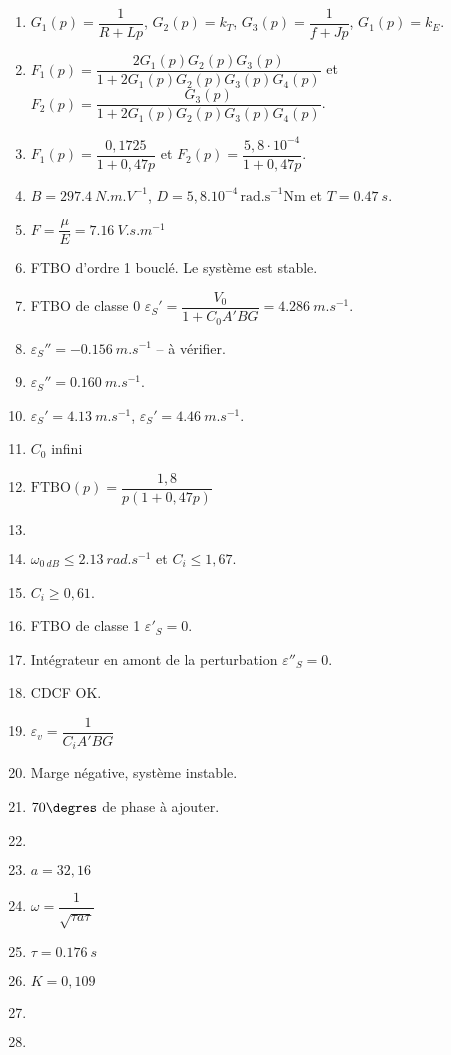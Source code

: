 \ifcolle
\else
\ifprof
\else
\begin{solution}
\begin{enumerate}
\item $G_1(p)=\dfrac{1}{R+Lp}$, $G_2(p)=k_T$, $G_3(p)=\dfrac{1}{f+Jp}$, $G_1(p)=k_E$. 
\item $F_1(p)=\dfrac{2G_1(p)G_2(p)G_3(p)}{1+2G_1(p)G_2(p)G_3(p)G_4(p)}$ et  
$F_2(p)=\dfrac{G_3(p)}{1+2G_1(p)G_2(p)G_3(p)G_4(p)}$.
\item $F_1(p)=\dfrac{0,1725}{1+0,47p}$ et $F_2(p)=\dfrac{5,8 \cdot 10^{-4}}{1+0,47p}$.
\item $B=\SI{297,4}{N.m.V^{-1}}$, $D=5,8.10^{-4}\,\text{rad.s}^{-1}\text{Nm}$ et $T=\SI{0,47}{s}$.
\item $F=\dfrac{\mu}{E}=\SI{7,16}{V.s.m^{-1}}$
\item FTBO d'ordre 1 bouclé. Le système est stable.
\item  FTBO de classe 0 $\varepsilon_S'=\dfrac{V_0}{1+C_0A'BG}=\SI{4,286}{m.s^{-1}}$.
\item $\varepsilon_S''=\SI{-0,156}{m.s^{-1}}$ -- à vérifier.
\item $\varepsilon_S''=\SI{0,160}{m.s^{-1}}$.
\item $\varepsilon_S'=\SI{4,13}{m.s^{-1}}$, $\varepsilon_S'=\SI{4,46}{m.s^{-1}}$.
\item $C_0$ infini
\item $\text{FTBO}(p)=\dfrac{1,8}{p\left(1+0,47 p \right)}$
\item $\quad$
\item $\omega_{\SI{0}{dB}}\leq\SI{2,13}{rad.s^{-1}}$ et $C_i\leq1,67$.
\item $C_i\geq 0,61$.
\item FTBO de classe 1 $\varepsilon'_S=0$.
\item Intégrateur en amont de la perturbation $\varepsilon''_S=0$.
\item CDCF OK.
\item $\varepsilon_v=\dfrac{1}{C_iA'BG}$
\item Marge négative, système instable.
\item $70\degres$ de phase à ajouter.
\item $\quad$
\item $a=32,16$
\item $\omega=\dfrac{1}{\sqrt{\tau a \tau}}$
\item $\tau = \SI{0,176}{s}$
\item $K=0,109$
\item $\quad$
\item $\quad$
\end{enumerate}
\end{solution}
\fi
\fi
